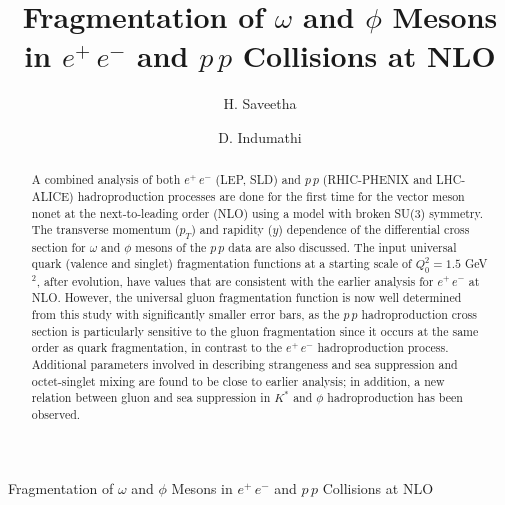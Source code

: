\documentclass{ws-ijmpa}
\begin{document}
{Fragmentation of $\omega$ and $\phi$ Mesons in $e^+\,e^-$ and 
$p\,p$ Collisions at NLO}


%
\catchline{}{}{}{}{}
%

\title{Fragmentation of $\omega$ and $\phi$ Mesons in $e^+\,e^-$ and $p\,p$ Collisions at NLO}

\author{H. Saveetha}
\address{Institute of Mathematical Sciences, \\ CIT Campus, \\ Chennai 600 113, India \\ saveetha@imsc.res.in}

\author{D. Indumathi}
\address{Institute of Mathematical Sciences, \\ CIT Campus, \\ Chennai 600 113, India \\ indu@imsc.res.in}


\begin{history}
\end{history}

\begin{abstract}

A combined analysis of both $e^+\,e^-$ (LEP, SLD) and $p\,p$ (RHIC-PHENIX
and LHC-ALICE) hadroproduction processes are done for the first time for
the vector meson nonet at the next-to-leading order (NLO) using a model
with broken SU(3) symmetry. The transverse momentum ($p_T$) and rapidity
($y$) dependence of the differential cross section for $\omega$ and $\phi$
mesons of the $p\,p$ data are also discussed.  The input universal quark
(valence and singlet) fragmentation functions at a starting scale of
$Q_0^2=1.5$ GeV$^2$, after evolution, have values that are consistent
with the earlier analysis for $e^+\,e^-$ at NLO. However, the universal
gluon fragmentation function is now well determined from this study with
significantly smaller error bars, as the $p\,p$ hadroproduction cross
section is particularly sensitive to the gluon fragmentation since it
occurs at the same order as quark fragmentation, in contrast to the
$e^+\,e^-$ hadroproduction process. Additional parameters involved in
describing strangeness and sea suppression and octet-singlet mixing
are found to be close to earlier analysis; in addition, a new relation
between gluon and sea suppression in $K^*$ and $\phi$ hadroproduction
has been observed.


\end{abstract}
\end{document}

